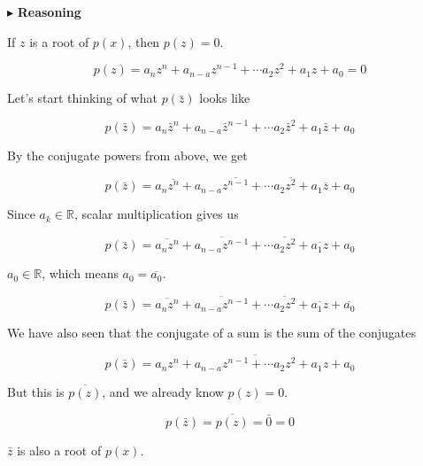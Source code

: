 \documentclass{ximera}
\begin{document}
$\blacktriangleright$ \textbf{Reasoning}




If $z$ is a root of $p(x)$, then $p(z) = 0$.


\[    p(z) = a_n z^n + a_{n-a} z^{n-1} + \cdots a_2 z^2 + a_1 z + a_0  = 0   \]


Let's start thinking of what $p(\bar{z})$ looks like



\[    p(\bar{z}) = a_n \bar{z}^n + a_{n-a} \bar{z}^{n-1} + \cdots a_2 \bar{z}^2 + a_1 \bar{z} + a_0    \]


By the conjugate powers from above, we get 


\[    p(\bar{z}) = a_n \overline{z^n} + a_{n-a} \overline{z^{n-1}} + \cdots a_2 \overline{z^2} + a_1 \overline{z} + a_0    \]



Since $a_k \in \mathbb{R}$, scalar multiplication gives us




\[    p(\bar{z}) = \overline{a_n z^n} +  \overline{a_{n-a} z^{n-1}} + \cdots  \overline{a_2 z^2} +  \overline{a_1 z} + a_0    \]



$a_0 \in \mathbb{R}$, which means $a_0 = \overline{a_0}$.



\[    p(\bar{z}) = \overline{a_n z^n} +  \overline{a_{n-a} z^{n-1}} + \cdots  \overline{a_2 z^2} +  \overline{a_1 z} + \overline{a_0}    \]





We have also seen that the conjugate of a sum is the sum of the conjugates


\[    p(\bar{z}) = \overline{a_n z^n + a_{n-a} z^{n-1} + \cdots  a_2 z^2 +  a_1 z + a_0}   \]



But this is $\overline{p(z)}$, and we already know  $p(z) = 0$.



\[    p(\bar{z}) = \overline{p(z)} = \bar{0} = 0  \]


$\bar{z}$ is also a root of $p(x)$.
\end{document}

